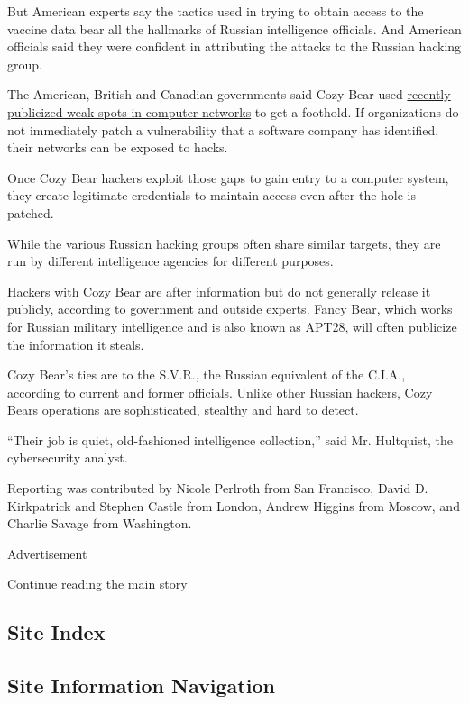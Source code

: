 But American experts say the tactics used in trying to obtain access to
the vaccine data bear all the hallmarks of Russian intelligence
officials. And American officials said they were confident in
attributing the attacks to the Russian hacking group.

The American, British and Canadian governments said Cozy Bear used
\href{https://media.defense.gov/2020/Jul/16/2002457639/-1/-1/0/NCSC_APT29_ADVISORY-QUAD-OFFICIAL-20200709-1810.PDF}{recently
publicized weak spots in computer networks} to get a foothold. If
organizations do not immediately patch a vulnerability that a software
company has identified, their networks can be exposed to hacks.

Once Cozy Bear hackers exploit those gaps to gain entry to a computer
system, they create legitimate credentials to maintain access even after
the hole is patched.

While the various Russian hacking groups often share similar targets,
they are run by different intelligence agencies for different purposes.

Hackers with Cozy Bear are after information but do not generally
release it publicly, according to government and outside experts. Fancy
Bear, which works for Russian military intelligence and is also known as
APT28, will often publicize the information it steals.

Cozy Bear's ties are to the S.V.R., the Russian equivalent of the
C.I.A., according to current and former officials. Unlike other Russian
hackers, Cozy Bears operations are sophisticated, stealthy and hard to
detect.

``Their job is quiet, old-fashioned intelligence collection,'' said Mr.
Hultquist, the cybersecurity analyst.

Reporting was contributed by Nicole Perlroth from San Francisco, David
D. Kirkpatrick and Stephen Castle from London, Andrew Higgins from
Moscow, and Charlie Savage from Washington.

Advertisement

\protect\hyperlink{after-bottom}{Continue reading the main story}

\hypertarget{site-index}{%
\subsection{Site Index}\label{site-index}}

\hypertarget{site-information-navigation}{%
\subsection{Site Information
Navigation}\label{site-information-navigation}}

